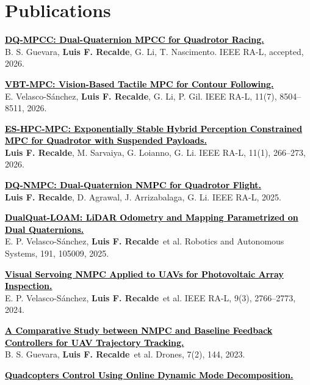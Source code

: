 \documentclass[letterpaper,11pt]{article}
\newcommand{\authorname}{\textcolor{AuthorTeal}{\textbf{Luis F. Recalde}}}
\newcommand{\journal}[1]{\textcolor{HeadingNavy}{#1}}
\newcommand{\papertitle}[1]{\textcolor{black}{\textbf{#1}}}
\begin{document}
\section{Publications}
\begin{enumerate}[leftmargin=0.28in, label={[\arabic*]}, itemsep=3pt, parsep=0pt, topsep=3pt]
\small
\item \href{https://arxiv.org/abs/2609.36482}{\papertitle{DQ-MPCC: Dual-Quaternion MPCC for Quadrotor Racing.}}\\
B. S. Guevara, \authorname, G. Li, T. Nascimento. \journal{IEEE RA-L}, accepted, 2026.
\item \href{https://doi.org/10.1109/LRA.2026.3698362}{\papertitle{VBT-MPC: Vision-Based Tactile MPC for Contour Following.}}\\
E. Velasco-S\'anchez, \authorname, G. Li, P. Gil. \journal{IEEE RA-L}, 11(7), 8504--8511, 2026.
\item \href{https://doi.org/10.1109/LRA.2025.3632070}{\papertitle{ES-HPC-MPC: Exponentially Stable Hybrid Perception Constrained MPC for Quadrotor with Suspended Payloads.}}\\
\authorname, M. Sarvaiya, G. Loianno, G. Li. \journal{IEEE RA-L}, 11(1), 266--273, 2026.
\item \href{https://doi.org/10.1109/LRA.2025.3623022}{\papertitle{DQ-NMPC: Dual-Quaternion NMPC for Quadrotor Flight.}}\\
\authorname, D. Agrawal, J. Arrizabalaga, G. Li. \journal{IEEE RA-L}, 2025.
\item \href{https://doi.org/10.1016/j.robot.2025.105009}{\papertitle{DualQuat-LOAM: LiDAR Odometry and Mapping Parametrized on Dual Quaternions.}}\\
E. P. Velasco-S\'anchez, \authorname\ et al. \journal{Robotics and Autonomous Systems}, 191, 105009, 2025.
\item \href{https://doi.org/10.1109/LRA.2024.3360876}{\papertitle{Visual Servoing NMPC Applied to UAVs for Photovoltaic Array Inspection.}}\\
E. P. Velasco-S\'anchez, \authorname\ et al. \journal{IEEE RA-L}, 9(3), 2766--2773, 2024.
\item \href{https://doi.org/10.3390/drones7020144}{\papertitle{A Comparative Study between NMPC and Baseline Feedback Controllers for UAV Trajectory Tracking.}}\\
B. S. Guevara, \authorname\ et al. \journal{Drones}, 7(2), 144, 2023.
\item \href{https://doi.org/10.1016/j.ifacol.2023.12.088}{\papertitle{Quadcopters Control Using Online Dynamic Mode Decomposition.}}\\

\end{enumerate}
\end{document}
